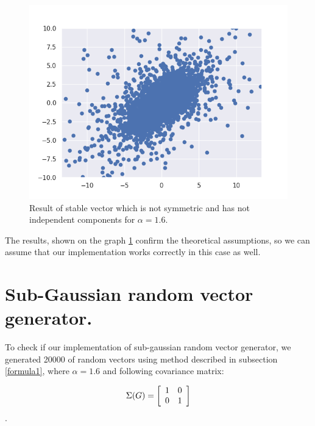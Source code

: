 \documentclass{article}
\begin{document}
	\begin{figure}[H]
		\centering
		\includegraphics[width=1\linewidth]{images/ex_1_c_alpha_stable_vector_simulation_symmetric_discreet_scatter}
		\caption{Result of stable vector which is not symmetric and has not independent components for $\alpha=1.6$.}\label{3}
	\end{figure}
	The results, shown on the graph \ref{3} confirm the theoretical assumptions, so we can assume that our implementation works correctly in this case as well.
	
	\section{Sub-Gaussian random vector generator.}\label{sec2}
	
	To check if our implementation of sub-gaussian random vector generator, we generated 20000 of random vectors using method described in subsection \ref{formula1}, where $\alpha = 1.6$ and following covariance matrix:
	
	\[\Sigma(G) = \left[{\begin{array}{*{20}c}
			1 & 0\\
			0 & 1\end{array} } \right]\]. 
	
\end{document}
